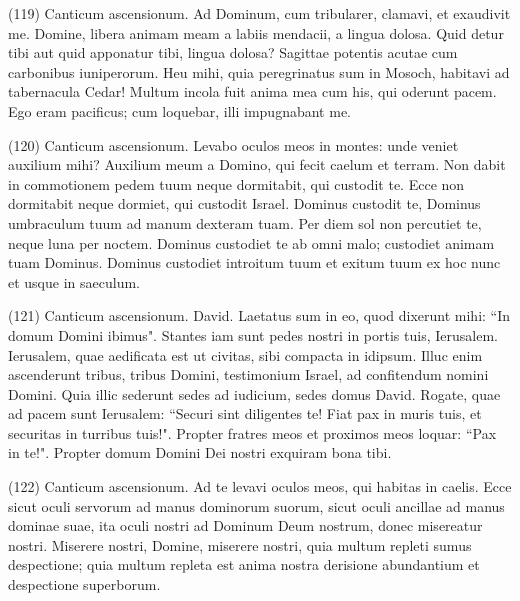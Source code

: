 \begin{biblechapter}  (119) 
\verse  Canticum ascensionum. Ad Dominum, cum tribularer, clamavi, et exaudivit me. 
\verse Domine, libera animam meam a labiis mendacii, a lingua dolosa. 
\verse Quid detur tibi aut quid apponatur tibi, lingua dolosa? 
\verse Sagittae potentis acutae cum carbonibus iuniperorum. 
\verse Heu mihi, quia peregrinatus sum in Mosoch, habitavi ad tabernacula Cedar! 
\verse Multum incola fuit anima mea cum his, qui oderunt pacem. 
\verse Ego eram pacificus; cum loquebar, illi impugnabant me. 
\end{biblechapter}

\begin{biblechapter}  (120) 
\verse  Canticum ascensionum. Levabo oculos meos in montes: unde veniet auxilium mihi? 
\verse Auxilium meum a Domino, qui fecit caelum et terram. 
\verse Non dabit in commotionem pedem tuum neque dormitabit, qui custodit te. 
\verse Ecce non dormitabit neque dormiet, qui custodit Israel. 
\verse Dominus custodit te, Dominus umbraculum tuum ad manum dexteram tuam. 
\verse Per diem sol non percutiet te, neque luna per noctem. 
\verse Dominus custodiet te ab omni malo; custodiet animam tuam Dominus. 
\verse Dominus custodiet introitum tuum et exitum tuum ex hoc nunc et usque in saeculum. 
\end{biblechapter}

\begin{biblechapter}  (121) 
\verse  Canticum ascensionum. David. Laetatus sum in eo, quod dixerunt mihi: “In domum Domini ibimus". 
\verse Stantes iam sunt pedes nostri in portis tuis, Ierusalem. 
\verse Ierusalem, quae aedificata est ut civitas, sibi compacta in idipsum. 
\verse Illuc enim ascenderunt tribus, tribus Domini, testimonium Israel, ad confitendum nomini Domini. 
\verse Quia illic sederunt sedes ad iudicium, sedes domus David. 
\verse Rogate, quae ad pacem sunt Ierusalem: “Securi sint diligentes te! 
\verse Fiat pax in muris tuis, et securitas in turribus tuis!". 
\verse Propter fratres meos et proximos meos loquar: “Pax in te!". 
\verse Propter domum Domini Dei nostri exquiram bona tibi. 
\end{biblechapter}

\begin{biblechapter}  (122) 
\verse  Canticum ascensionum. Ad te levavi oculos meos, qui habitas in caelis. 
\verse Ecce sicut oculi servorum ad manus dominorum suorum, sicut oculi ancillae ad manus dominae suae, ita oculi nostri ad Dominum Deum nostrum, donec misereatur nostri. 
\verse Miserere nostri, Domine, miserere nostri, quia multum repleti sumus despectione; 
\verse quia multum repleta est anima nostra derisione abundantium et despectione superborum. 
\end{biblechapter}

